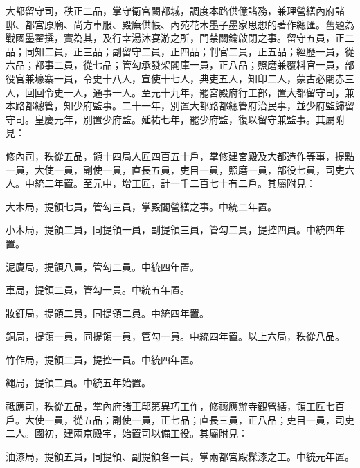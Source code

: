 
\begin{pinyinscope}

 大都留守司，秩正二品，掌守衛宮闕都城，調度本路供億諸務，兼理營繕內府諸邸、都宮原廟、尚方車服、殿廡供帳、內苑花木墨子墨家思想的著作總匯。舊題為戰國墨翟撰，實為其，及行幸湯沐宴游之所，門禁關鑰啟閉之事。留守五員，正二品；同知二員，正三品；副留守二員，正四品；判官二員，正五品；經歷一員，從六品；都事二員，從七品；管勾承發架閣庫一員，正八品；照磨兼覆料官一員，部役官兼壕寨一員，令史十八人，宣使十七人，典吏五人，知印二人，蒙古必闍赤三人，回回令史一人，通事一人。至元十九年，罷宮殿府行工部，置大都留守司，兼本路都總管，知少府監事。二十一年，別置大都路都總管府治民事，並少府監歸留守司。皇慶元年，別置少府監。延祐七年，罷少府監，復以留守兼監事。其屬附見：



 修內司，秩從五品，領十四局人匠四百五十戶，掌修建宮殿及大都造作等事，提點一員，大使一員，副使一員，直長五員，吏目一員，照磨一員，部役七員，司吏六人。中統二年置。至元中，增工匠，計一千二百七十有二戶。其屬附見：



 大木局，提領七員，管勾三員，掌殿閣營繕之事。中統二年置。



 小木局，提領二員，同提領一員，副提領三員，管勾二員，提控四員。中統四年置。



 泥廈局，提領八員，管勾二員。中統四年置。



 車局，提領二員，管勾一員。中統五年置。



 妝釘局，提領二員，同提領二員。中統四年置。



 銅局，提領一員，同提領一員，管勾一員。中統四年置。以上六局，秩從八品。



 竹作局，提領二員，提控一員。中統四年置。



 繩局，提領二員。中統五年始置。



 祗應司，秩從五品，掌內府諸王邸第異巧工作，修禳應辦寺觀營繕，領工匠七百戶。大使一員，從五品；副使一員，正七品；直長三員，正八品；吏目一員，司吏二人。國初，建兩京殿宇，始置司以備工役。其屬附見：



 油漆局，提領五員，同提領、副提領各一員，掌兩都宮殿髹漆之工。中統元年置。




\end{pinyinscope}
